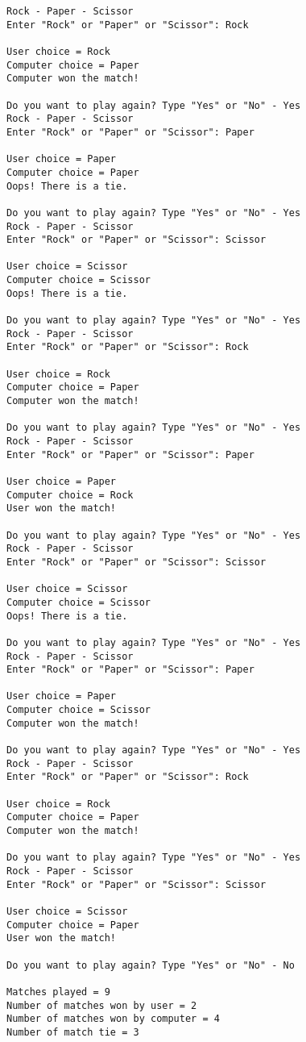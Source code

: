 \documentclass[11pt]{article}
\begin{document}
    \begin{Verbatim}[commandchars=\\\{\}]
Rock - Paper - Scissor
Enter "Rock" or "Paper" or "Scissor": Rock

User choice = Rock
Computer choice = Paper
Computer won the match!

Do you want to play again? Type "Yes" or "No" - Yes
Rock - Paper - Scissor
Enter "Rock" or "Paper" or "Scissor": Paper

User choice = Paper
Computer choice = Paper
Oops! There is a tie.

Do you want to play again? Type "Yes" or "No" - Yes
Rock - Paper - Scissor
Enter "Rock" or "Paper" or "Scissor": Scissor

User choice = Scissor
Computer choice = Scissor
Oops! There is a tie.

Do you want to play again? Type "Yes" or "No" - Yes
Rock - Paper - Scissor
Enter "Rock" or "Paper" or "Scissor": Rock

User choice = Rock
Computer choice = Paper
Computer won the match!

Do you want to play again? Type "Yes" or "No" - Yes
Rock - Paper - Scissor
Enter "Rock" or "Paper" or "Scissor": Paper

User choice = Paper
Computer choice = Rock
User won the match!

Do you want to play again? Type "Yes" or "No" - Yes
Rock - Paper - Scissor
Enter "Rock" or "Paper" or "Scissor": Scissor

User choice = Scissor
Computer choice = Scissor
Oops! There is a tie.

Do you want to play again? Type "Yes" or "No" - Yes
Rock - Paper - Scissor
Enter "Rock" or "Paper" or "Scissor": Paper

User choice = Paper
Computer choice = Scissor
Computer won the match!

Do you want to play again? Type "Yes" or "No" - Yes
Rock - Paper - Scissor
Enter "Rock" or "Paper" or "Scissor": Rock

User choice = Rock
Computer choice = Paper
Computer won the match!

Do you want to play again? Type "Yes" or "No" - Yes
Rock - Paper - Scissor
Enter "Rock" or "Paper" or "Scissor": Scissor

User choice = Scissor
Computer choice = Paper
User won the match!

Do you want to play again? Type "Yes" or "No" - No

Matches played = 9
Number of matches won by user = 2
Number of matches won by computer = 4
Number of match tie = 3
    \end{Verbatim}
\end{document}
